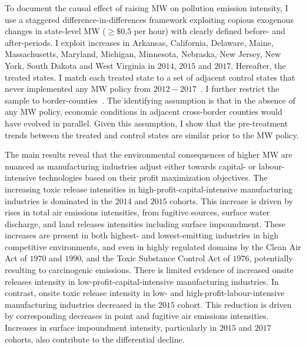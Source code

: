 \documentclass{C:/Users/david/OneDrive/Documents/ULMS/PhD/Thesis/chapter3/src/climate_change/latex/Economic_Journal/OUP-EJ}
\begin{document}
    To document the causal effect of raising MW on pollution emission intensity, I use a staggered difference-in-differences framework exploiting copious exogenous changes in state-level MW ($\geq \$0.5$ per hour) with clearly defined before- and after-periods. I exploit increases in Arkansas, California, Delaware, Maine, Massachusetts, Maryland, Michigan, Minnesota, Nebraska, New Jersey, New York, South Dakota and West Virginia in $2014$, $2015$ and $2017$. Hereafter, the treated states. I match each treated state to a set of adjacent control states that never implemented any MW policy from $2012-2017$~\citep{gopalan2021state}. I further restrict the sample to border-counties~\citep{dube2010minimum}. The identifying assumption is that in the absence of any MW policy, economic conditions in adjacent cross-border counties would have evolved in parallel. Given this assumption, I show that the pre-treatment trends between the treated and control states are similar prior to the MW policy.

    The main results reveal that the environmental consequences of higher MW are nuanced as manufacturing industries adjust either towards capital- or labour-intensive technologies based on their profit maximization objectives. The increasing toxic release intensities in high-profit-capital-intensive manufacturing industries is dominated in the $2014$ and $2015$ cohorts. This increase is driven by rises in total air emissions intensities, from fugitive sources, surface water discharge, and land releases intensities including surface impoundment. These increases are present in both highest- and lowest-emitting industries in high competitive environments, and even in highly regulated domains by the Clean Air Act of $1970$ and $1990$, and the Toxic Substance Control Act of $1976$, potentially resulting to carcinogenic emissions. There is limited evidence of increased onsite releases intensity in low-profit-capital-intensive manufacturing industries. In contrast, onsite toxic release intensity in low- and high-profit-labour-intensive manufacturing industries decreased in the $2015$ cohort. This reduction is driven by corresponding decreases in point and fugitive air emissions intensities. Increases in surface impoundment intensity, particularly in $2015$ and $2017$ cohorts, also contribute to the differential decline.
\end{document}
